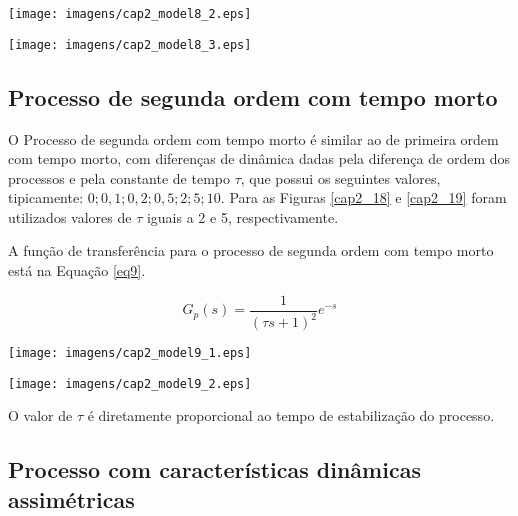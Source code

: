     \begin{center}
        \texttt{[image: imagens/cap2\_model8\_2.eps]}
	\label{cap2_8_2}
    \end{center}
    
    \begin{center}
        \texttt{[image: imagens/cap2\_model8\_3.eps]}
	\label{cap2_8_3}
    \end{center}

\subsection{Processo de segunda ordem com tempo morto}
    
    O Processo de segunda ordem com tempo morto é similar ao de primeira ordem
    com tempo morto, com diferenças de dinâmica dadas pela diferença de ordem
    dos processos e pela constante de tempo $\tau$, que possui os seguintes valores,
    tipicamente: $0; 0,1; 0,2; 0,5; 2; 5; 10$. Para as Figuras
    \ref{cap2_18} e \ref{cap2_19} foram utilizados valores de $\tau$ iguais
    a 2 e 5, respectivamente.
    
    A função de transferência para o processo de segunda ordem com tempo morto está na
    Equação \ref{eq9}.
    
    \begin{equation}
        \label{eq9}
        G_p(s) = \frac{1}{(\tau s +1)^2}e^{-s}
    \end{equation}

    \begin{center}
        \texttt{[image: imagens/cap2\_model9\_1.eps]}
        \label{cap2_18}
    \end{center}
    
    \begin{center}
        \texttt{[image: imagens/cap2\_model9\_2.eps]}
        \label{cap2_19}
    \end{center}

    O valor de $\tau$ é diretamente proporcional ao tempo de estabilização do processo.

\subsection{Processo com características dinâmicas assimétricas}
    

